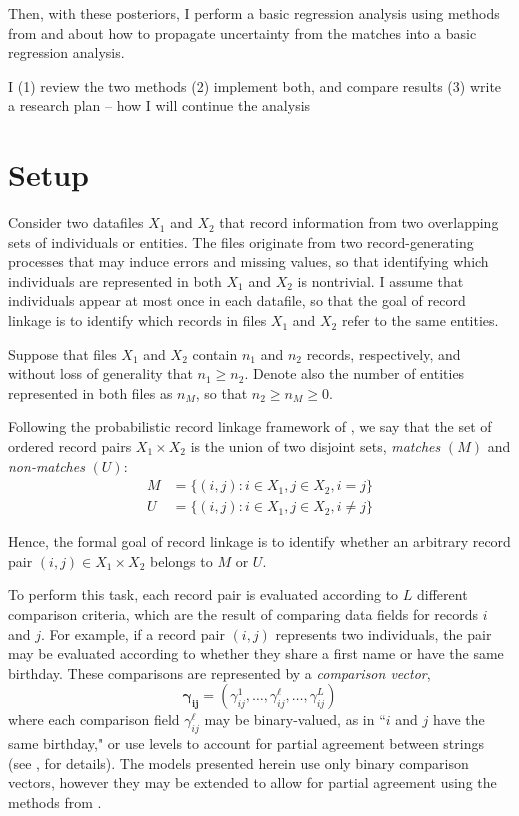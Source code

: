 \documentclass[11pt,reqno]{amsart}
\begin{document}
Then, with these posteriors, I perform a basic regression analysis using methods from \cite{lahiri_larsen_2005} and \cite{tancredi_liseo_2015} \cite{tancredi_liseo_2011} about how to propagate uncertainty from the matches into a basic regression analysis.   

I (1) review the two methods
(2) implement both, and compare results
(3) write a research plan -- how I will continue the analysis

\section{Setup}

Consider two datafiles $X_1$ and $X_2$ that record information from two overlapping sets of individuals or entities.  The files originate from two record-generating processes that may induce errors and missing values, so that identifying which individuals are represented in both $X_1$ and $X_2$ is nontrivial.  I assume that individuals appear at most once in each datafile, so that the goal of record linkage is to identify which records in files $X_1$ and $X_2$ refer to the same entities.

Suppose that files $X_1$ and $X_2$ contain $n_1$ and $n_2$ records, respectively, and without loss of generality that $n_1 \geq n_2$.  Denote also the number of entities represented in both files as $n_{M}$, so that $n_2\geq n_M \geq 0$. 

Following the probabilistic record linkage framework of \cite{fs1969}, we say that the set of ordered record pairs $X_1 \times X_2$ is the union of two disjoint sets, \textit{matches} $(M)$ and \textit{non-matches} $(U)$:
\begin{align*} M &= \{(i,j): i\in X_1, j\in X_2, i=j\} \\ U &= \{(i,j): i\in X_1, j\in X_2, i\neq j\}\end{align*} 

Hence, the formal goal of record linkage is to identify whether an arbitrary record pair $(i,j)\in X_1\times X_2$ belongs to $M$ or $U$. 

To perform this task, each record pair is evaluated according to $L$ different comparison criteria, which are the result of comparing data fields for records $i$ and $j$.  For example, if a record pair $(i,j)$ represents two individuals, the pair may be evaluated according to whether they share a first name or have the same birthday.  These comparisons are represented by a \textit{comparison vector}, $$\mathbf{\gamma_{ij}}= (\gamma_{ij}^1, \dots, \gamma_{ij}^{\ell}, \dots, \gamma_{ij}^L)$$  where each comparison field $\gamma_{ij}^{\ell}$ may be binary-valued, as in ``$i$ and $j$ have the same birthday," or use levels to account for partial agreement between strings (see \citealp{winkler90}, for details).  The models presented herein use only binary comparison vectors, however they may be extended to allow for partial agreement using the methods from \cite{sadinle_2017}.
\end{document}
